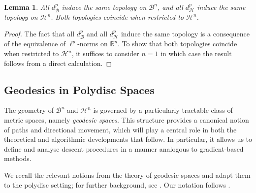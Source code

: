 \documentclass[10pt]{article}
\newtheorem{lemma}[theorem]{Lemma}
\theoremstyle{definition}
\def\log{{\rm log}}
\newcommand{\RR}{\mathbb{R}}
\newcommand{\val}{{\mathrm{val}}}
\begin{document}
\begin{lemma}
  \label{lem:metricTopologicallyEquivalent}
  All $d_{\mathcal{B}}^p$ induce the same topology on $\mathcal B^n$, and all $d_{\mathcal{H}}^p$ induce the same topology on $\mathcal H^n$.  Both topologies coincide when restricted to $\mathcal H^n$.
\end{lemma}
\begin{proof}
  The fact that all $d_{\mathcal{B}}^p$ and all $d_{\mathcal{H}}^p$ induce the same topology is a consequence of the equivalence of $\ell^p$-norms on $\RR^n$.  To show that both topologies coincide when restricted to $\mathcal H^n$, it suffices to consider $n=1$ in which case the result follows from a direct calculation.
\end{proof}

\subsection{Geodesics in Polydisc Spaces}

The geometry of $\mathcal{B}^n$ and $\mathcal{H}^n$ is governed by a particularly tractable class of metric spaces, namely \emph{geodesic spaces}. This structure provides a canonical notion of paths and directional movement, which will play a central role in both the theoretical and algorithmic developments that follow. In particular, it allows us to define and analyse descent procedures in a manner analogous to gradient-based methods.

We recall the relevant notions from the theory of geodesic spaces and adapt them to the polydisc setting; for further background, see \cite{BuragoBuragoIvanov2001, Gromov2007}. Our notation follows \cite{Lang2013}.

\end{document}
